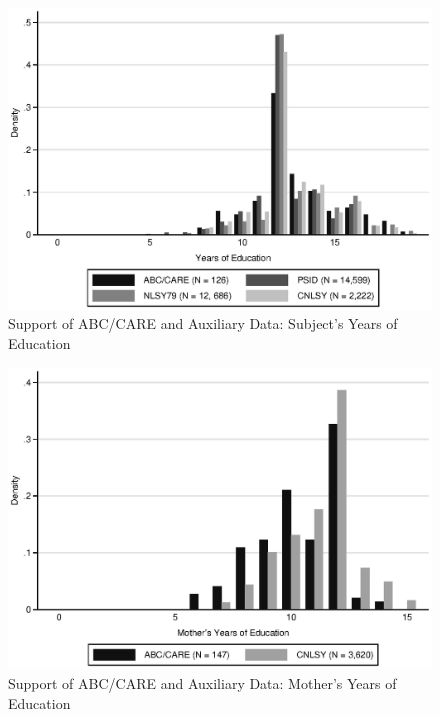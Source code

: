 \documentclass[static]{JJH-Beamer}
\begin{document}
\begin{frame}

\begin{figure}[H]\addtocounter{figure}{-1}
\caption{Support of ABC/CARE and Auxiliary Data: Subject's Years of Education} \label{fig:support_educ}
\begin{center}
\includegraphics[width=.75\textwidth]{AppOutput/Methodology/support_educ.eps}
\end{center}
\end{figure}

\end{frame}

\begin{frame}

\begin{figure}[H]\addtocounter{figure}{-1}
\caption{Support of ABC/CARE and Auxiliary Data: Mother's Years of Education} \label{fig:support_meduc}
\begin{center}
\includegraphics[width=.75\textwidth]{AppOutput/Methodology/support_momed.eps}
\end{center}
\end{figure}

\end{frame}
\end{document}
